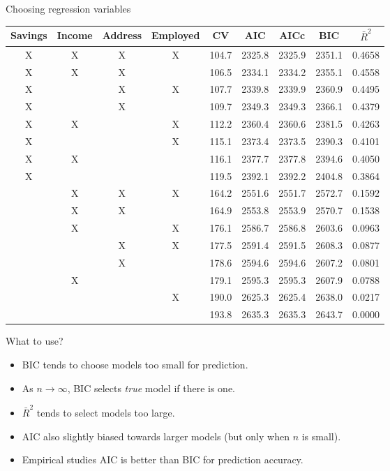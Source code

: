 \documentclass[14pt]{beamer}
\makeatletter
\def\biz{\begin{itemize}[<+-| alert@+>]}
\def\eiz{\end{itemize}}
\makeatother
\begin{document}
\begin{frame}{Choosing regression variables}\footnotesize\vspace*{-0.2cm}
{\tabcolsep=0.1cm
\hspace*{-0.3cm}\begin{tabular}{ccccccccc}
  \hline
 Savings & Income & Address & Employed & CV & AIC & AICc & BIC & $\bar{R}^2$ \\
  \hline
  X & X & X & X & 104.7 & 2325.8 & 2325.9 & 2351.1 & 0.4658 \\
  X & X & X &   & 106.5 & 2334.1 & 2334.2 & 2355.1 & 0.4558 \\
  X &   & X & X & 107.7 & 2339.8 & 2339.9 & 2360.9 & 0.4495 \\
  X &   & X &   & 109.7 & 2349.3 & 2349.3 & 2366.1 & 0.4379 \\
  X & X &   & X & 112.2 & 2360.4 & 2360.6 & 2381.5 & 0.4263 \\
  X &   &   & X & 115.1 & 2373.4 & 2373.5 & 2390.3 & 0.4101 \\
  X & X &   &   & 116.1 & 2377.7 & 2377.8 & 2394.6 & 0.4050 \\
  X &   &   &   & 119.5 & 2392.1 & 2392.2 & 2404.8 & 0.3864 \\
    & X & X & X & 164.2 & 2551.6 & 2551.7 & 2572.7 & 0.1592 \\
    & X & X &   & 164.9 & 2553.8 & 2553.9 & 2570.7 & 0.1538 \\
    & X &   & X & 176.1 & 2586.7 & 2586.8 & 2603.6 & 0.0963 \\
    &   & X & X & 177.5 & 2591.4 & 2591.5 & 2608.3 & 0.0877 \\
    &   & X &   & 178.6 & 2594.6 & 2594.6 & 2607.2 & 0.0801 \\
    & X &   &   & 179.1 & 2595.3 & 2595.3 & 2607.9 & 0.0788 \\
    &   &   & X & 190.0 & 2625.3 & 2625.4 & 2638.0 & 0.0217 \\
    &   &   &   & 193.8 & 2635.3 & 2635.3 & 2643.7 & 0.0000 \\
   \hline
\end{tabular}}

\end{frame}


\begin{frame}{What to use?}

\pause
\biz
\item BIC tends to choose models too small for prediction.

\item As $n\rightarrow\infty$, BIC selects \emph{true} model if there is one.

\item $\bar{R}^2$ tends to select models too large.

\item AIC also slightly biased towards larger models (but only when $n$ is small).

\item Empirical studies AIC is better than BIC for prediction accuracy.
\eiz
\end{frame}
\end{document}
